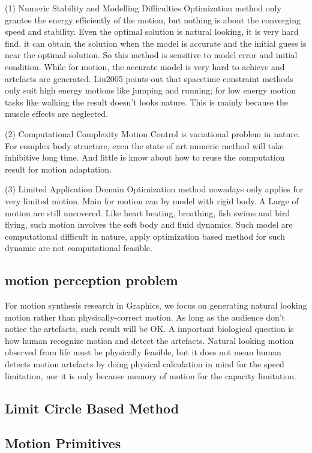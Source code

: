 (1) Numeric Stability and Modelling Difficulties
Optimization method only grantee the energy efficiently of the motion, but nothing is about the converging speed and stability. Even the optimal solution is natural looking, it is very hard find.
it can obtain the solution when the model is accurate and the initial guess is near the optimal solution.
So this method is sensitive to model error and initial condition. 
While for motion, the accurate model is very hard to achieve and artefacts are generated.
Liu2005  points out that spacetime constraint methods only suit high energy motions like jumping and running; for low energy motion tasks like walking the result doesn't looks nature. This is mainly because the muscle effects are neglected.

(2) Computational Complexity
Motion Control is variational problem in nature. For complex body structure, even the state of art numeric method will take inhibitive long time. And little is know about how to reuse the computation result for motion adaptation.

(3) Limited Application Domain
Optimization method nowadays only applies for very limited motion. Main for motion can by model with rigid body.
 A Large of motion are still uncovered. Like heart beating, breathing, fish swims and bird flying, such motion involves the soft body and fluid dynamics. Such model are computational difficult in nature, apply optimization based method for such dynamic are not computational feasible.
 
\subsection{motion perception problem}
For motion synthesis research in Graphics, we focus on generating natural looking motion rather than physically-correct motion. 
As long as the audience don’t notice the artefacts, such result will be OK. 
A important biological question is how human recognize motion and detect the artefacts.
 Natural looking motion observed from life must be physically feasible, but it does not mean human detects motion artefacts by doing physical calculation in mind for the speed limitation, nor it is only because memory of motion for the capacity limitation.
\subsection{Limit Circle Based Method}

\subsection{Motion Primitives}
